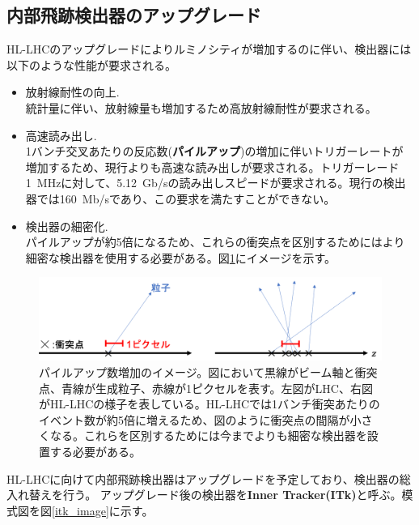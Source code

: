 \subsection{内部飛跡検出器のアップグレード}
HL-LHCのアップグレードによりルミノシティが増加するのに伴い、検出器には以下のような性能が要求される。

\begin{itemize}
  \item 放射線耐性の向上.\\
  統計量に伴い、放射線量も増加するため高放射線耐性が要求される。
  \item 高速読み出し.\\
  1バンチ交叉あたりの反応数(\textbf{パイルアップ})の増加に伴いトリガーレートが増加するため、現行よりも高速な読み出しが要求される。トリガーレード1~MHzに対して、5.12~Gb/sの読み出しスピードが要求される。現行の検出器では160~Mb/sであり、この要求を満たすことができない。
  \item 検出器の細密化.\\
  パイルアップが約5倍になるため、これらの衝突点を区別するためにはより細密な検出器を使用する必要がある。図\ref{detector_posi_res}にイメージを示す。
\end{itemize}

\begin{figure}[bpt]\centering
\includegraphics[width=12cm]{./detector_posi_res.png}
\caption[パイルアップ数増加のイメージ]{パイルアップ数増加のイメージ。図において黒線がビーム軸と衝突点、青線が生成粒子、赤線が1ピクセルを表す。左図がLHC、右図がHL-LHCの様子を表している。HL-LHCでは1バンチ衝突あたりのイベント数が約5倍に増えるため、図のように衝突点の間隔が小さくなる。これらを区別するためには今までよりも細密な検出器を設置する必要がある。}
\label{detector_posi_res}
\end{figure}

HL-LHCに向けて内部飛跡検出器はアップグレードを予定しており、検出器の総入れ替えを行う。
アップグレード後の検出器を\textbf{Inner Tracker(ITk)}と呼ぶ。模式図を図\ref{itk_image}に示す。

